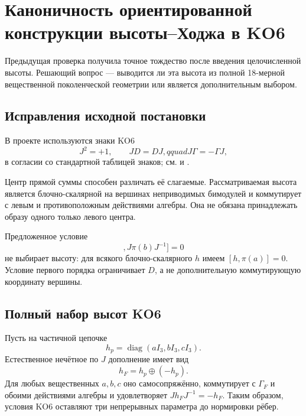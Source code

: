 \chapter{Каноничность ориентированной конструкции высоты--Ходжа в KO6}

Предыдущая проверка получила точное тождество после введения целочисленной
высоты. Решающий вопрос --- выводится ли эта высота из полной 18-мерной
вещественной поколенческой геометрии или является дополнительным выбором.

\section{Исправления исходной постановки}

В проекте используются знаки KO6
\begin{equation}
 J^2=+1,\qquad JD=DJ,qquad J\Gamma=-\Gamma J,
\end{equation}
в согласии со стандартной таблицей знаков; см.  и
.

Центр прямой суммы способен различать её слагаемые. Рассматриваемая высота
является блочно-скалярной на вершинах неприводимых бимодулей и коммутирует с
левым и противоположным действиями алгебры. Она не обязана принадлежать
образу одного только левого центра.

Предложенное условие
\begin{equation}
 [[h,\pi(a)],J\pi(b)J^{-1}]=0
 \label{eq:v5-height-proposed-first-order}
\end{equation}
не выбирает высоту: для всякого блочно-скалярного \(h\) имеем
\([h,\pi(a)]=0\). Условие первого порядка ограничивает \(D\), а не
дополнительную коммутирующую координату вершины.

\section{Полный набор высот KO6}

Пусть на частичной цепочке
\begin{equation}h_p=\operatorname{diag}(aI_3,bI_3,cI_3).\end{equation}
Естественное нечётное по \(J\) дополнение имеет вид
\begin{equation}
 h_F=h_p\oplus(-h_p).
 \label{eq:v5-full-ko6-height}
\end{equation}
Для любых вещественных \(a,b,c\) оно самосопряжённо, коммутирует с
\(\Gamma_F\) и обоими действиями алгебры и удовлетворяет
\(Jh_FJ^{-1}=-h_F\). Таким образом, условия KO6 оставляют три непрерывных
параметра до нормировки рёбер.

